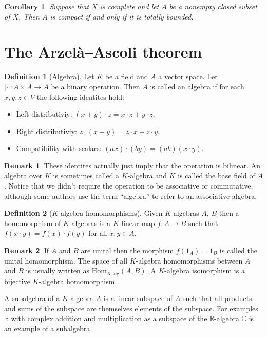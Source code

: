 \documentclass[11pt,a4paper]{article}
\theoremstyle{definition}
\newtheorem{definition}{Definition}[section]
\newtheorem{remark}{Remark}[section]
\theoremstyle{plain}
\newtheorem{corollary}[theorem]{Corollary}
\newcommand{\R}{\mathbb{R}}
\newcommand{\C}{\mathbb{C}}
\newcommand{\abs}[1]{\left\lvert #1\right\rvert}
\begin{document}
  \begin{corollary}
    Suppose that $X$ is complete and let $A$ be a nonempty closed subset
    of $X$. Then $A$ is compact if and only if it is totally bounded.
  \end{corollary}

  \newpage

  \section{The Arzelà–Ascoli theorem}\label{sec:the-AA-theorem}
  \begin{definition}[Algebra]
    Let $K$ be a field and $A$ a vector 
    space. Let $\abs{\cdot} \colon A \times A \to A$ be a binary operation.
    Then $A$ is called an algebra if for each $x,y,z \in V$ 
    the following identites hold:
    \begin{itemize}
      \item Left distributiviy: $(x + y) \cdot z = x \cdot z + y \cdot z$.
      \item Right distributiviy: $z \cdot (x + y) = z \cdot x + z \cdot y$.
      \item Compatibility with scalars: 
      $(ax) \cdot (by) = (ab) (x \cdot y)$.
    \end{itemize}
  \end{definition}
  
  \begin{remark}
    These identites actually just imply that the operation is bilinear.
    An algebra over $K$ is sometimes called a $K$-algebra and $K$ is
    called the base field of $A$. Notice that we didn't require the operation
    to be associative or commutative, although some authors use the term
    ``algebra'' to refer to an associative algebra.
  \end{remark}

  \begin{definition}[$K$-algebra homomorphisms]
    Given $K$-algebras $A$, $B$ then a homomorphism of $K$-algebras
    is a $K$-linear map $f \colon A \to B$ such that 
    $f(x \cdot y)=f(x) \cdot f(y)$ for all $x,y \in A$.
  \end{definition}
  \begin{remark}
    If $A$ and $B$ are unital then the morphism
    $f(1_A) = 1_B$ is called the unital homomorphism. The space
    of all $K$-algebra homomorphisms between $A$ and $B$ is usually 
    written as ${\mathrm{Hom}}_{K\text{-alg}}(A,B)$. A $K$-algebra
    isomorphism is a bijective $K$-algebra homomorphism.
  \end{remark}
  A subalgebra of a $K$-algebra $A$ is a linear subspace of $A$ such
  that all products and sums of the subspace are themselves elements
  of the subspace. For examples $\R$ with complex addition and 
  multiplication as a subspace of the $\R$-algebra $\C$ is an example
  of a subalgebra.
\end{document}
